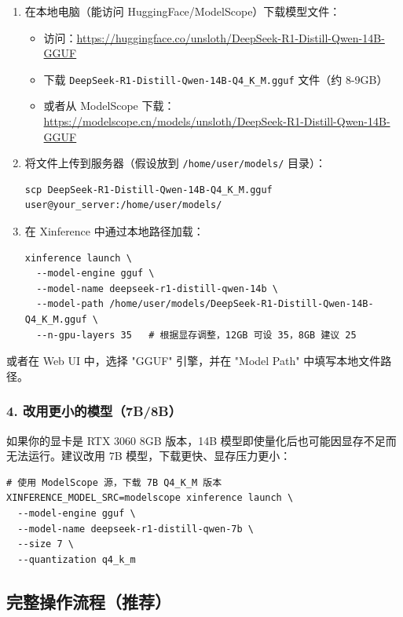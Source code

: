 \documentclass[12pt,UTF8]{ctexbook}
\begin{document}
\begin{enumerate}[leftmargin=2cm]
    \item 在本地电脑（能访问 HuggingFace/ModelScope）下载模型文件：
        \begin{itemize}[leftmargin=1cm]
            \item 访问：\url{https://huggingface.co/unsloth/DeepSeek-R1-Distill-Qwen-14B-GGUF}
            \item 下载 \texttt{DeepSeek-R1-Distill-Qwen-14B-Q4\_K\_M.gguf} 文件（约 8-9GB）
            \item 或者从 ModelScope 下载：\url{https://modelscope.cn/models/unsloth/DeepSeek-R1-Distill-Qwen-14B-GGUF}
        \end{itemize}
    \item 将文件上传到服务器（假设放到 \texttt{/home/user/models/} 目录）：
        \begin{lstlisting}
scp DeepSeek-R1-Distill-Qwen-14B-Q4_K_M.gguf user@your_server:/home/user/models/
        \end{lstlisting}
    \item 在 Xinference 中通过本地路径加载：
        \begin{lstlisting}
xinference launch \
  --model-engine gguf \
  --model-name deepseek-r1-distill-qwen-14b \
  --model-path /home/user/models/DeepSeek-R1-Distill-Qwen-14B-Q4_K_M.gguf \
  --n-gpu-layers 35   # 根据显存调整，12GB 可设 35，8GB 建议 25
        \end{lstlisting}
\end{enumerate}

或者在 Web UI 中，选择 "GGUF" 引擎，并在 "Model Path" 中填写本地文件路径。

\subsubsection{4. 改用更小的模型（7B/8B）}

如果你的显卡是 RTX 3060 8GB 版本，14B 模型即使量化后也可能因显存不足而无法运行。建议改用 7B 模型，下载更快、显存压力更小：

\begin{lstlisting}
# 使用 ModelScope 源，下载 7B Q4_K_M 版本
XINFERENCE_MODEL_SRC=modelscope xinference launch \
  --model-engine gguf \
  --model-name deepseek-r1-distill-qwen-7b \
  --size 7 \
  --quantization q4_k_m
\end{lstlisting}

\subsection{完整操作流程（推荐）}
\end{document}
